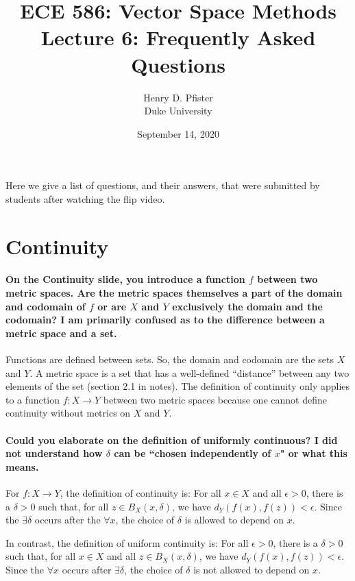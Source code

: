 \documentclass[10pt,english]{article}
\begin{document}
\title{ECE 586: Vector Space Methods \\ Lecture 6: Frequently Asked Questions}
\author{Henry D. Pfister \\ Duke University}
\date{September 14, 2020}

\maketitle

Here we give a list of questions, and their answers, that were submitted by students after watching the flip video.

\section{Continuity}

\paragraph{On the Continuity slide, you introduce a function $f$ between two metric spaces. Are the metric spaces themselves a part of the domain and codomain of $f$ or are $X$ and $Y$ exclusively the domain and the codomain? I am primarily confused as to the difference between a metric space and a set.} 

Functions are defined between sets.
So, the domain and codomain are the sets $X$ and $Y$.
A metric space is a set that has a well-defined ``distance'' between any two elements of the set (section 2.1 in notes).
The definition of continuity only applies to a function $f\colon X \to Y$ between two metric spaces because one cannot define continuity without metrics on $X$ and $Y$.


\paragraph{Could you elaborate on the definition of uniformly continuous? I did not understand how $\delta$ can be ``chosen independently of $x$" or what this means.}

For $f:X \to Y$, the definition of continuity is: For all $x\in X$ and all $\epsilon > 0$, there is a $\delta >0$ such that, for all $z \in B_X (x,\delta)$, we have $d_Y (f(x),f(z)) < \epsilon$.
Since the $\exists\delta$ occurs after the $\forall x$, the choice of $\delta$ is allowed to depend on $x$.

In contrast, the definition of uniform continuity is: For all $\epsilon > 0$, there is a $\delta >0$ such that, for all $x\in X$ and all $z \in B_X (x,\delta)$, we have $d_Y (f(x),f(z)) < \epsilon$.
Since the $\forall x$ occurs after $\exists\delta$, the choice of $\delta$ is not allowed to depend on $x$.
\end{document}
